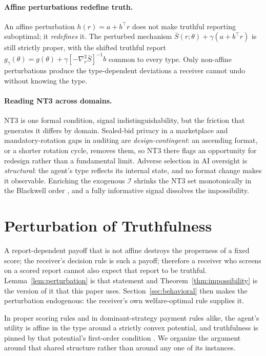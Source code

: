 \documentclass[acmsmall,nonacm,screen]{acmart}
\theoremstyle{acmplain}%
\theoremstyle{acmdefinition}%
\newcommand{\calI}{\mathcal{I}}
\newcommand{\Sbar}{\bar{S}}
\numberwithin{equation}{section}
\begin{document}
\paragraph{Affine perturbations redefine truth.}
An affine perturbation $h(r) = a + b^\top r$ does not make truthful reporting suboptimal; it \emph{redefines} it. The perturbed mechanism $\Sbar(r;\theta) + \gamma(a + b^\top r)$ is still strictly proper, with the shifted truthful report $g_\gamma(\theta) = g(\theta) + \gamma[-\nabla^2_r \Sbar]^{-1} b$ common to every type. Only non-affine perturbations produce the type-dependent deviations a receiver cannot undo without knowing the type.

\paragraph{Reading NT3 across domains.}
NT3 is one formal condition, signal indistinguishability, but the friction that generates it differs by domain. Sealed-bid privacy in a marketplace and mandatory-rotation gaps in auditing are \emph{design-contingent}: an ascending format, or a shorter rotation cycle, removes them, so NT3 there flags an opportunity for redesign rather than a fundamental limit. Adverse selection in AI oversight is \emph{structural}: the agent's type reflects its internal state, and no format change makes it observable. Enriching the exogenous $\calI$ shrinks the NT3 set monotonically in the Blackwell order \citep{blackwell1951comparison}, and a fully informative signal dissolves the impossibility.

\section{Perturbation of Truthfulness}\label{sec:fenchel}

A report-dependent payoff that is not affine destroys the properness of a fixed score; the receiver's decision rule is such a payoff; therefore a receiver who screens on a scored report cannot also expect that report to be truthful. Lemma~\ref{lem:perturbation} is that statement and Theorem~\ref{thm:impossibility} is the version of it that this paper uses. Section~\ref{sec:behavioral} then makes the perturbation endogenous: the receiver's own welfare-optimal rule supplies it.

In proper scoring rules and in dominant-strategy payment rules alike, the agent's utility is affine in the type around a strictly convex potential, and truthfulness is pinned by that potential's first-order condition \citep{schervish1989general,abernethy2012characterization,vohra2011mechanism}. We organize the argument around that shared structure rather than around any one of its instances.
\end{document}

